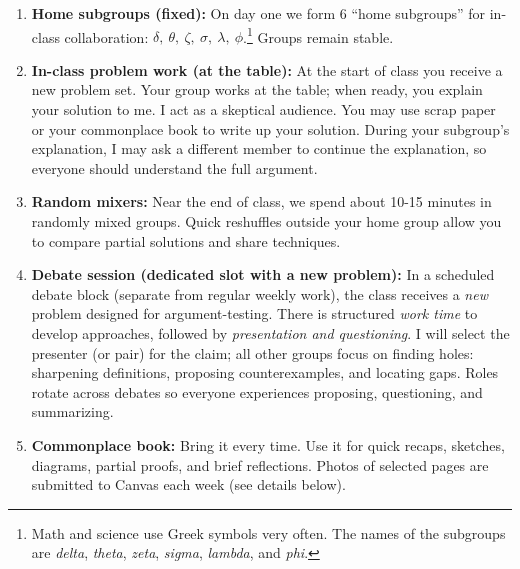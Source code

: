 \documentclass[oneside,11pt]{amsart}
\begin{document}
\begin{enumerate}[$\bullet$]
  \item \textbf{Home subgroups (fixed):} On day one we form 6 ``home subgroups'' for in-class collaboration:
  $\delta, \ \theta, \ \zeta, \ \sigma, \ \lambda, \ \phi$.\footnote{Math and science use Greek symbols very often. The names of the subgroups are 
	\emph{delta}, \emph{theta}, \emph{zeta}, \emph{sigma}, \emph{lambda}, and \emph{phi}.}
	Groups remain stable.

  \item \textbf{In-class problem work (at the table):} At
	the start of class you receive a new problem set.
	Your group works at the table; when ready, you explain
	your solution to me. I act as a skeptical audience.
	You may use scrap paper or your commonplace book to write up your solution.
	During your subgroup's explanation, I may ask a different member to continue the explanation,
	so everyone should understand the full argument.

  \item \textbf{Random mixers:} 
		Near the end of class, we spend about 10-15 minutes 
		in randomly mixed groups.
		Quick reshuffles outside your home group allow you
		to compare partial solutions and share techniques.
		
	 \item \textbf{Debate session (dedicated slot with a new
	 problem):} In a scheduled debate block (separate from
	 regular weekly work), the class receives a \emph{new}
	 problem designed for argument-testing. There is
	 structured \emph{work time} to develop approaches,
	 followed by \emph{presentation and questioning}. I will
	 select the presenter (or pair) for the claim; all other
	 groups focus on finding holes: sharpening definitions,
	 proposing counterexamples, and locating gaps. Roles
	 rotate across debates so everyone experiences proposing,
	 questioning, and summarizing.

  \item \textbf{Commonplace book:} Bring it every time.
	Use it for quick recaps, sketches, diagrams, partial
	proofs, and brief reflections. Photos of selected pages
	are submitted to Canvas each week (see details below).


\end{enumerate}
\end{document}
